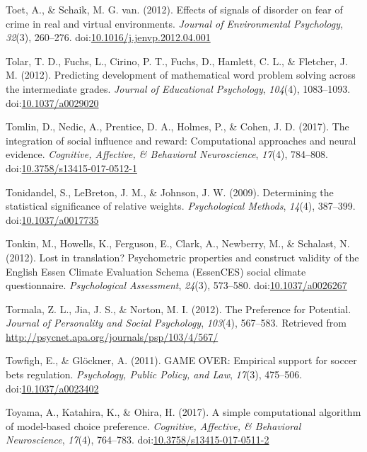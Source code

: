 \documentclass[english,man]{apa6}
\begin{document}
\hypertarget{ref-Toet2012}{}
Toet, A., \& Schaik, M. G. van. (2012). Effects of signals of disorder
on fear of crime in real and virtual environments. \emph{Journal of
Environmental Psychology}, \emph{32}(3), 260--276.
doi:\href{https://doi.org/10.1016/j.jenvp.2012.04.001}{10.1016/j.jenvp.2012.04.001}

\hypertarget{ref-Tolar2012}{}
Tolar, T. D., Fuchs, L., Cirino, P. T., Fuchs, D., Hamlett, C. L., \&
Fletcher, J. M. (2012). Predicting development of mathematical word
problem solving across the intermediate grades. \emph{Journal of
Educational Psychology}, \emph{104}(4), 1083--1093.
doi:\href{https://doi.org/10.1037/a0029020}{10.1037/a0029020}

\hypertarget{ref-Tomlin2017}{}
Tomlin, D., Nedic, A., Prentice, D. A., Holmes, P., \& Cohen, J. D.
(2017). The integration of social influence and reward: Computational
approaches and neural evidence. \emph{Cognitive, Affective, \&
Behavioral Neuroscience}, \emph{17}(4), 784--808.
doi:\href{https://doi.org/10.3758/s13415-017-0512-1}{10.3758/s13415-017-0512-1}

\hypertarget{ref-Tonidandel2009}{}
Tonidandel, S., LeBreton, J. M., \& Johnson, J. W. (2009). Determining
the statistical significance of relative weights. \emph{Psychological
Methods}, \emph{14}(4), 387--399.
doi:\href{https://doi.org/10.1037/a0017735}{10.1037/a0017735}

\hypertarget{ref-Tonkin2012}{}
Tonkin, M., Howells, K., Ferguson, E., Clark, A., Newberry, M., \&
Schalast, N. (2012). Lost in translation? Psychometric properties and
construct validity of the English Essen Climate Evaluation Schema
(EssenCES) social climate questionnaire. \emph{Psychological
Assessment}, \emph{24}(3), 573--580.
doi:\href{https://doi.org/10.1037/a0026267}{10.1037/a0026267}

\hypertarget{ref-Tormala2012}{}
Tormala, Z. L., Jia, J. S., \& Norton, M. I. (2012). The Preference for
Potential. \emph{Journal of Personality and Social Psychology},
\emph{103}(4), 567--583. Retrieved from
\url{http://psycnet.apa.org/journals/psp/103/4/567/}

\hypertarget{ref-Towfigh2011}{}
Towfigh, E., \& Glöckner, A. (2011). GAME OVER: Empirical support for
soccer bets regulation. \emph{Psychology, Public Policy, and Law},
\emph{17}(3), 475--506.
doi:\href{https://doi.org/10.1037/a0023402}{10.1037/a0023402}

\hypertarget{ref-Toyama2017}{}
Toyama, A., Katahira, K., \& Ohira, H. (2017). A simple computational
algorithm of model-based choice preference. \emph{Cognitive, Affective,
\& Behavioral Neuroscience}, \emph{17}(4), 764--783.
doi:\href{https://doi.org/10.3758/s13415-017-0511-2}{10.3758/s13415-017-0511-2}
\end{document}
